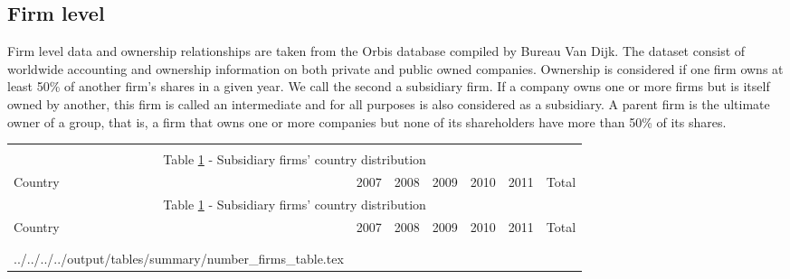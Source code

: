 \documentclass[12pt]{article}
\makeatletter
\newcommand\primitiveinput[1]
{\@@input #1 }
\makeatother
\begin{document}
	  	
 	\subsection{Firm level} \label{subsec:firm}
	Firm level data and ownership relationships are taken from the Orbis database compiled by Bureau Van Dijk. The dataset consist of worldwide accounting and ownership information on both private and public owned companies. Ownership is considered if one firm owns at least 50\% of another firm's shares in a given year. We call the second a subsidiary firm. If a company owns one or more firms but is itself owned by another, this firm is called an intermediate and for all purposes is also considered as a subsidiary. A parent firm is the ultimate owner of a group, that is, a firm that owns one or more companies but none of its shareholders have more than 50\% of its shares.
	
	\begin{small}
		{
			\begin{longtable}{lrrrrrr}\\
				\label{tab:number of firms}\\
				\multicolumn{7}{c}{Table \ref{tab:number of firms} - Subsidiary firms' country distribution}\\
				\hline \hline \addlinespace Country & 2007 & 2008 & 2009 & 2010 & 2011 & Total  \\
				\endfirsthead
				\multicolumn{7}{c}{Table \ref{tab:number of firms} - Subsidiary firms' country distribution}\\
				\hline \hline \addlinespace Country & 2007 & 2008 & 2009 & 2010 & 2011 & Total  \\
				\hline \addlinespace \endhead
				\hline
				\multicolumn{7}{r}{{\textit{(Continued)}}}\\ \endfoot
				\\ 	
				\endlastfoot
				\primitiveinput{../../../../output/tables/summary/number_firms_table.tex}
				\hline 			
			\end{longtable}	
		}
	\end{small}
	
\end{document}
